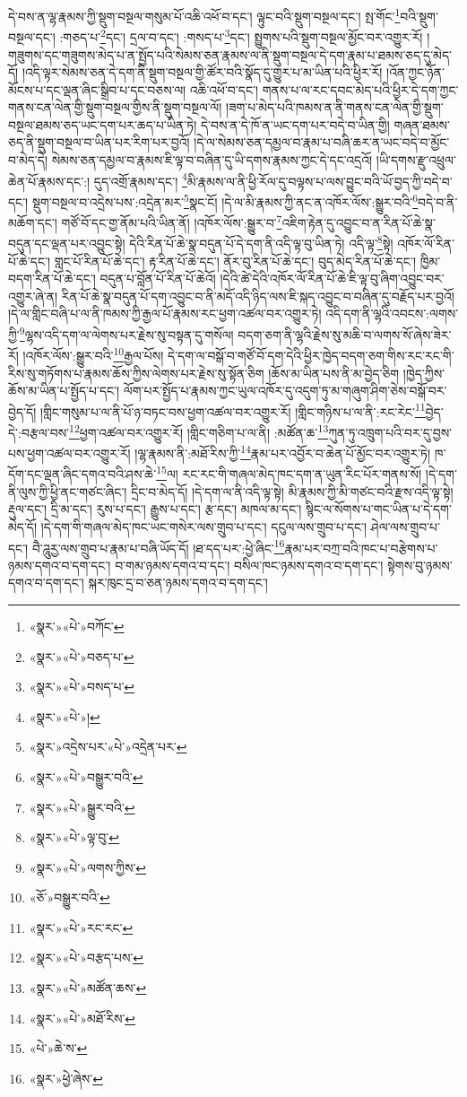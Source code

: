 དེ་བས་ན་ལྷ་རྣམས་ཀྱི་སྡུག་བསྔལ་གསུམ་པོ་འཆི་འཕོ་བ་དང་། ལྟུང་བའི་སྡུག་བསྔལ་དང་། སྤ་གོང་\footnote{«སྣར་»«པེ་»བཀོང་}བའི་སྡུག་བསྔལ་དང་། :གཅད་པ་\footnote{«སྣར་»«པེ་»བཅད་པ་}དང་། དྲལ་བ་དང་། :གསད་པ་\footnote{«སྣར་»«པེ་»བསད་པ་}དང་། སྤྱུགས་པའི་སྡུག་བསྔལ་མྱོང་བར་འགྱུར་རོ། །གཟུགས་དང་གཟུགས་མེད་པ་ན་སྤྱོད་པའི་སེམས་ཅན་རྣམས་ལ་ནི་སྡུག་བསྔལ་དེ་དག་རྣམ་པ་ཐམས་ཅད་དུ་མེད་དོ། །འདི་ལྟར་སེམས་ཅན་དེ་དག་ནི་སྡུག་བསྔལ་གྱི་ཚོར་བའི་སྣོད་དུ་གྱུར་པ་མ་ཡིན་པའི་ཕྱིར་རོ། །འོན་ཀྱང་ཉོན་མོངས་པ་དང་ལྡན་ཞིང་སྒྲིབ་པ་དང་བཅས་ལ། འཆི་འཕོ་བ་དང་། གནས་པ་ལ་རང་དབང་མེད་པའི་ཕྱིར་དེ་དག་ཀྱང་གནས་ངན་ལེན་གྱི་སྡུག་བསྔལ་གྱིས་ནི་སྡུག་བསྔལ་ལོ། །ཟག་པ་མེད་པའི་ཁམས་ན་ནི་གནས་ངན་ལེན་གྱི་སྡུག་བསྔལ་ཐམས་ཅད་ཡང་དག་པར་ཆད་པ་ཡིན་ཏེ། དེ་བས་ན་དེ་ཁོ་ན་ཡང་དག་པར་བདེ་བ་ཡིན་གྱི། གཞན་ཐམས་ཅད་ནི་སྡུག་བསྔལ་བ་ཡིན་པར་རིག་པར་བྱའོ། །དེ་ལ་སེམས་ཅན་དམྱལ་བ་རྣམ་པ་བཞི་ཆར་ན་ཡང་བདེ་བ་མྱོང་བ་མེད་དེ། སེམས་ཅན་དམྱལ་བ་རྣམས་ཇི་ལྟ་བ་བཞིན་དུ་ཡི་དགས་རྣམས་ཀྱང་དེ་དང་འདྲའོ། །ཡི་དགས་རྫུ་འཕྲུལ་ཆེན་པོ་རྣམས་དང་:། དུད་འགྲོ་རྣམས་དང་། \footnote{«སྣར་»«པེ་»།  }མི་རྣམས་ལ་ནི་ཕྱི་རོལ་དུ་བལྟས་པ་ལས་བྱུང་བའི་ཡོ་བྱད་ཀྱི་བདེ་བ་དང་། སྡུག་བསྔལ་བ་འདྲེས་པས་:འདྲེན་མར་\footnote{«སྣར་»འདྲེས་པར་«པེ་»འདྲེན་པར་}སྣང་ངོ། །དེ་ལ་མི་རྣམས་ཀྱི་ནང་ན་འཁོར་ལོས་:སྒྱུར་བའི་\footnote{«སྣར་»«པེ་»བསྒྱུར་བའི་}བདེ་བ་ནི་མཆོག་དང་། གཙོ་བོ་དང་གྱ་ནོམ་པའི་ཡིན་ནོ། །འཁོར་ལོས་:སྒྱུར་བ་\footnote{«སྣར་»«པེ་»སྒྱུར་བའི་}འཇིག་རྟེན་དུ་འབྱུང་བ་ན་རིན་པོ་ཆེ་སྣ་བདུན་དང་ལྡན་པར་འབྱུང་སྟེ། དེའི་རིན་པོ་ཆེ་སྣ་བདུན་པོ་དེ་དག་ནི་འདི་ལྟ་བུ་ཡིན་ཏེ། འདི་ལྟ་\footnote{«སྣར་»«པེ་»ལྟ་བུ་}སྟེ། འཁོར་ལོ་རིན་པོ་ཆེ་དང་། གླང་པོ་རིན་པོ་ཆེ་དང་། རྟ་རིན་པོ་ཆེ་དང་། ནོར་བུ་རིན་པོ་ཆེ་དང་། བུད་མེད་རིན་པོ་ཆེ་དང་། ཁྱིམ་བདག་རིན་པོ་ཆེ་དང་། བདུན་པ་བློན་པོ་རིན་པོ་ཆེའོ། །དེའི་ཚེ་དེའི་འཁོར་ལོ་རིན་པོ་ཆེ་ཇི་ལྟ་བུ་ཞིག་འབྱུང་བར་འགྱུར་ཞེ་ན། རིན་པོ་ཆེ་སྣ་བདུན་པོ་དག་འབྱུང་བ་ནི་མདོ་འདི་ཉིད་ལས་ཇི་སྐད་འབྱུང་བ་བཞིན་དུ་བརྗོད་པར་བྱའོ། །དེ་ལ་གླིང་བཞི་པ་ལ་ནི་ཁམས་ཀྱི་རྒྱལ་པོ་རྣམས་རང་ཕྱག་འཚལ་བར་འགྱུར་ཏེ། འདི་དག་ནི་ལྷའི་འབངས་:ལགས་ཀྱི་\footnote{«སྣར་»«པེ་»ལགས་ཀྱིས་}ལྷས་འདི་དག་ལ་ལེགས་པར་རྗེས་སུ་བསྟན་དུ་གསོལ། བདག་ཅག་ནི་ལྷའི་རྗེས་སུ་མཆི་བ་ལགས་སོ་ཞེས་ཟེར་རོ། །འཁོར་ལོས་:སྒྱུར་བའི་\footnote{«ཅོ་»བསྒྱུར་བའི་}རྒྱལ་པོས། དེ་དག་ལ་བསྒོ་བ་གཙོ་བོ་དག་དེའི་ཕྱིར་ཁྱེད་བདག་ཅག་གིས་རང་རང་གི་རིས་སུ་གཏོགས་པ་རྣམས་ཆོས་ཀྱིས་ལེགས་པར་རྗེས་སུ་སྟོན་ཅིག །ཆོས་མ་ཡིན་པས་ནི་མ་བྱེད་ཅིག །ཁྱེད་ཀྱིས་ཆོས་མ་ཡིན་པ་སྤྱོད་པ་དང་། ལོག་པར་སྤྱོད་པ་རྣམས་ཀྱང་ཡུལ་འཁོར་དུ་འདུག་ཏུ་མ་གཞུག་ཤིག་ཅེས་བསྒོ་བར་བྱེད་དོ། །གླིང་གསུམ་པ་ལ་ནི་པོ་ཉ་བཏང་བས་ཕྱག་འཚལ་བར་འགྱུར་རོ། །གླིང་གཉིས་པ་ལ་ནི་:རང་རེང་\footnote{«སྣར་»«པེ་»རང་རང་}བྱེད་དེ་:བརྩལ་བས་\footnote{«སྣར་»«པེ་»བརྩད་པས་}ཕྱག་འཚལ་བར་འགྱུར་རོ། །གླིང་གཅིག་པ་ལ་ནི། :མཚོན་ཆ་\footnote{«སྣར་»«པེ་»མཚོན་ཆས་}ཀུན་ཏུ་འཁྲུག་པའི་བར་དུ་བྱས་པས་ཕྱག་འཚལ་བར་འགྱུར་རོ། །ལྷ་རྣམས་ནི་:མཐོ་རིས་ཀྱི་\footnote{«སྣར་»«པེ་»མཐོ་རིས་}རྣམ་པར་འབྱོར་བ་ཆེན་པོ་མྱོང་བར་འགྱུར་ཏེ། ཁ་དོག་དང་ལྡན་ཞིང་དགའ་བའི་ཤས་ཆེ་\footnote{«པེ་»ཆེ་ས་}ལ། རང་རང་གི་གཞལ་མེད་ཁང་དག་ན་ཡུན་རིང་པོར་གནས་སོ། །དེ་དག་ནི་ལུས་ཀྱི་ཕྱི་ནང་གཙང་ཞིང་། དྲིང་བ་མེད་དོ། །དེ་དག་ལ་ནི་འདི་ལྟ་སྟེ། མི་རྣམས་ཀྱི་མི་གཙང་བའི་རྫས་འདི་ལྟ་སྟེ། རྡུལ་དང་། དྲི་མ་དང་། རུས་པ་དང་། རྒྱུས་པ་དང་། རྩ་དང་། མཁལ་མ་དང་། སྙིང་ལ་སོགས་པ་གང་ཡིན་པ་དེ་དག་མེད་དོ། །དེ་དག་གི་གཞལ་མེད་ཁང་ཡང་གསེར་ལས་གྲུབ་པ་དང་། དངུལ་ལས་གྲུབ་པ་དང་། ཤེལ་ལས་གྲུབ་པ་དང་། བཻ་ཌཱུརྱ་ལས་གྲུབ་པ་རྣམ་པ་བཞི་ཡོད་དོ། །ཐ་དད་པར་:ཕྱེ་ཞིང་\footnote{«སྣར་»ཕྱེ་ཞེས་}རྣམ་པར་བཀྲ་བའི་ཁང་པ་བརྩེགས་པ་ཉམས་དགའ་བ་དག་དང་། བ་གམ་ཉམས་དགའ་བ་དང་། བསིལ་ཁང་ཉམས་དགའ་བ་དག་དང་། སྟེགས་བུ་ཉམས་དགའ་བ་དག་དང་། སྐར་ཁུང་དྲ་བ་ཅན་ཉམས་དགའ་བ་དག་དང་། 